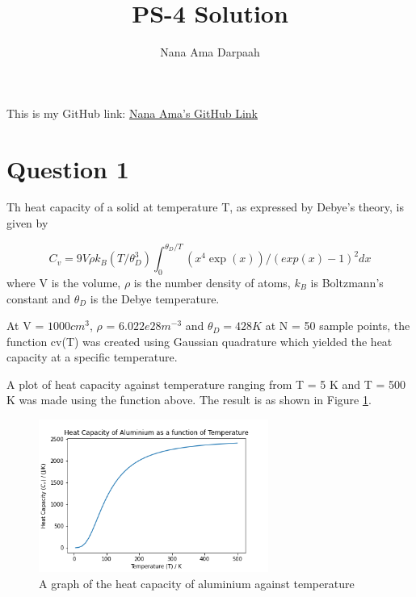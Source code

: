 \documentclass[11pt]{article}
\title{PS-4 Solution}
\author{Nana Ama Darpaah}
\begin{document}
	\maketitle
	This is my GitHub link: \href{https://github.com/nnd2016/phys-ga2000.git}{Nana Ama's GitHub Link}
	
\section{Question 1}
Th heat capacity of a solid at temperature T, as expressed by Debye's theory, is given by

\begin{equation}
	C_{v} = 9V\rho k_{B}(T/\theta_{D}^{3})\int_{0}^{\theta_{D}/T}(x^{4}\exp(x))/(exp(x)-1)^{2} dx
\end{equation}
where V is the volume, $\rho$ is the number density of atoms, $k_{B}$ is Boltzmann's constant and $\theta_{D}$ is the Debye temperature.

At V = $1000 cm^{3}$,  $\rho$ = $6.022e28 m^{-3}$ and $\theta_{D} = 428 K$ at N = 50 sample points, the function cv(T) was created using Gaussian quadrature which yielded the heat capacity at a specific temperature.

A plot of heat capacity against temperature ranging from T = 5 K and T = 500 K was made using the function above. The result is as shown in Figure \ref{fig:heat_capacity}.
\begin{figure}[h]\begin{center} 
		\vspace{12pt}
		\includegraphics[width=0.67\textwidth]{heat_capacity.png} 
		\caption{A graph of the heat capacity of aluminium against temperature }
		\label{fig:heat_capacity}
	\end{center}
\end{figure} 
	
\end{document}
